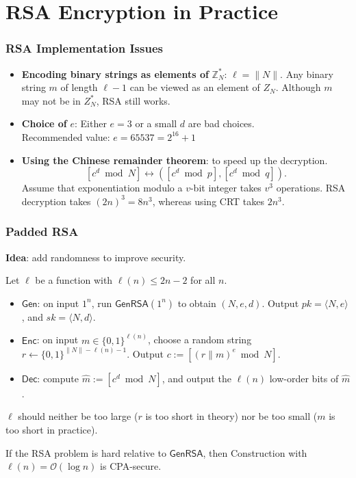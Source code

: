 \section{RSA Encryption in Practice}
\begin{frame}\frametitle{RSA Implementation Issues}
\begin{itemize}
\item \textbf{Encoding binary strings as elements of} $\mathbb{Z}^*_N$: $\ell = \|N\|$. Any binary string $m$ of length $\ell - 1$ can be viewed as an element of $Z_N$. Although $m$ may not be in $Z_N^*$, RSA still works.
\item \textbf{Choice of} $e$: Either $e=3$ or a small $d$ are bad choices. \\
      Recommended value: $e=65537=2^{16}+1$
\item \textbf{Using the Chinese remainder theorem}: to speed up the decryption.\\
\[ [c^d \bmod N] \leftrightarrow ([c^d \bmod p],[c^d \bmod q]). \]
Assume that exponentiation modulo a $v$-bit integer takes $v^3$ operations. RSA decryption takes $(2n)^3=8n^3$, whereas using CRT takes $2n^3$. 
\end{itemize}
\end{frame}
\begin{frame}\frametitle{Padded RSA}
\textbf{Idea}: add randomness to improve security.
\begin{construction}
Let $\ell$ be a function with $\ell(n) \le 2n-2$ for all $n$.
\begin{itemize}
\item $\mathsf{Gen}$: on input $1^n$, run $\mathsf{GenRSA}(1^n)$ to obtain $(N,e,d)$. Output $pk = \langle N,e \rangle$, and $sk = \langle N,d \rangle$.
\item $\mathsf{Enc}$: on input $m \in \{0,1\}^{\ell(n)}$, choose a random string $r \gets \{0,1\}^{\|N\| - \ell(n)-1}$. Output $c:=[(r\|m)^e \bmod N]$.
\item $\mathsf{Dec}$: compute $\hat{m} := [c^d \bmod N]$, and output the $\ell(n)$ low-order bits of $\hat{m}$.
\end{itemize}
\end{construction}
$\ell$ should neither be too large ($r$ is too short in theory) nor be too small ($m$ is too short in practice).
\begin{theorem}
If the RSA problem is hard relative to $\mathsf{GenRSA}$, then Construction with $\ell(n)=\mathcal{O}(\log n)$ is CPA-secure.
\end{theorem}
\end{frame}

